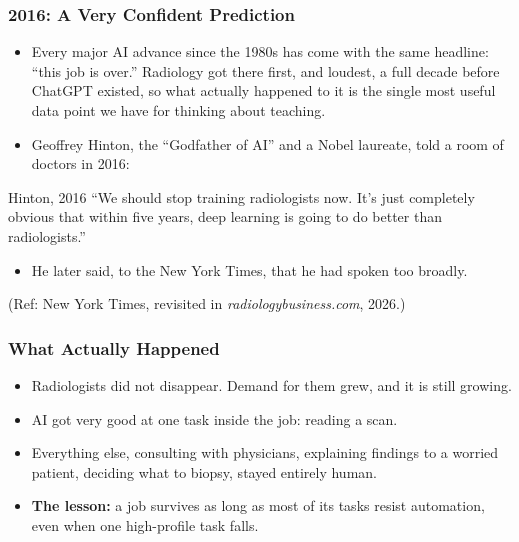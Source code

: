 \begin{frame}[fragile]\frametitle{2016: A Very Confident Prediction}
\begin{itemize}
\item Every major AI advance since the 1980s has come with the same headline: ``this job is over.'' Radiology got there first, and loudest, a full decade before ChatGPT existed, so what actually happened to it is the single most useful data point we have for thinking about teaching.
\item Geoffrey Hinton, the ``Godfather of AI'' and a Nobel laureate, told a room of doctors in 2016:
\end{itemize}
\begin{alertblock}{Hinton, 2016}
``We should stop training radiologists now. It's just completely obvious that within five years, deep learning is going to do better than radiologists.''
\end{alertblock}
\begin{itemize}
\item He later said, to the New York Times, that he had spoken too broadly.
\end{itemize}
{\tiny (Ref: New York Times, revisited in \emph{radiologybusiness.com}, 2026.)}
\end{frame}

\begin{frame}[fragile]\frametitle{What Actually Happened}
\begin{itemize}
\item Radiologists did not disappear. Demand for them grew, and it is still growing.
\item AI got very good at one task inside the job: reading a scan.
\item Everything else, consulting with physicians, explaining findings to a worried patient, deciding what to biopsy, stayed entirely human.
\item \textbf{The lesson:} a job survives as long as most of its tasks resist automation, even when one high-profile task falls.
\end{itemize}
\end{frame}

